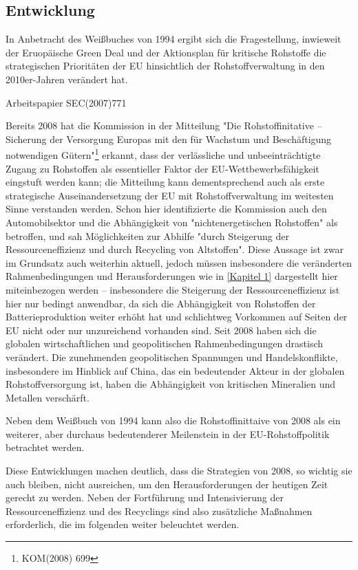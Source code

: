 \documentclass[12pt,a4paper,oneside]{book} %
\begin{document}
		
	\subsection{Entwicklung}
	
	In Anbetracht des Weißbuches von 1994 ergibt sich die Fragestellung, inwieweit der Eruopäische Green Deal und der Aktionsplan für kritische Rohstoffe die strategischen Prioritäten der EU hinsichtlich der Rohstoffverwaltung in den 2010er-Jahren verändert hat.
	
	Arbeitspapier SEC(2007)771
	
	Bereits 2008 hat die Kommission in der Mitteilung "Die Rohstoffinitative -- Sicherung der Versorgung Europas mit den für Wachstum und Beschäftigung notwendigen Gütern"\footnote{KOM(2008) 699} erkannt, dass der verlässliche und unbeeinträchtigte Zugang zu Rohstoffen als essentieller Faktor der EU-Wettbewerbsfähigkeit eingstuft werden kann; die Mitteilung kann dementsprechend auch als erste strategische Auseinandersetzung der EU mit Rohstoffverwaltung im weitesten Sinne verstanden werden. Schon hier identifizierte die Kommission auch den Automobilsektor und die Abhängigkeit von "nichtenergetischen Rohstoffen" als betroffen, und sah Möglichkeiten zur Abhilfe "durch Steigerung der Ressourceneffizienz und durch Recycling von Altstoffen". Diese Aussage ist zwar im Grundsatz auch weiterhin aktuell, jedoch müssen insbesondere die veränderten Rahmenbedingungen und Herausforderungen wie in \ref{Kapitel 1} dargestellt hier miteinbezogen werden -- insbesondere die Steigerung der Ressourceneffizienz ist hier nur bedingt anwendbar, da sich die Abhängigkeit von Rohstoffen der Batterieproduktion weiter erhöht hat und schlichtweg Vorkommen auf Seiten der EU nicht oder nur unzureichend vorhanden sind. Seit 2008 haben sich die globalen wirtschaftlichen und geopolitischen Rahmenbedingungen drastisch verändert. Die zunehmenden geopolitischen Spannungen und Handelskonflikte, insbesondere im Hinblick auf China, das ein bedeutender Akteur in der globalen Rohstoffversorgung ist, haben die Abhängigkeit von kritischen Mineralien und Metallen verschärft. 
	
	Neben dem Weißbuch von 1994 kann also die Rohstoffinittaive von 2008 als ein weiterer, aber durchaus bedeutenderer Meilenstein in der EU-Rohstoffpolitik betrachtet werden.
	
	Diese Entwicklungen machen deutlich, dass die Strategien von 2008, so wichtig sie auch bleiben, nicht ausreichen, um den Herausforderungen der heutigen Zeit gerecht zu werden. Neben der Fortführung und Intensivierung der Ressourceneffizienz und des Recyclings sind also zusätzliche Maßnahmen erforderlich, die im folgenden weiter beleuchtet werden.
	
\end{document}
